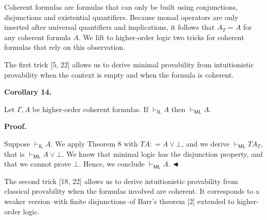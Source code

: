 \documentclass[10pt,a4paper]{article}
\begin{document}
Coherent formulas are formulas that can only be built using conjunctions, disjunctions and existential quantifiers. Because monad operators are only inserted after universal quantifiers and implications, it follows that $A_{T}=A$ for any coherent formula $A$. We lift to higher-order logic two tricks for coherent formulas that rely on this observation.\par
 
 
 
The first trick [5, 22] allows us to derive minimal provability from intuitionistic provability when the context is empty and when the formula is coherent.\par
 
 
 
\par\medskip\noindent\textbf{Corollary 14.}\par
 
 
Let $\Gamma,A$ be higher-order coherent formulas. If $\vdash_{\mathsf{IL}}A$ then $\vdash_{\mathsf{ML}}A$.\par
 
 
 
 
\par\medskip\noindent\textbf{Proof.}\par
 
 
Suppose $\vdash_{\mathsf{IL}}A$. We apply Theorem 8 with $TA\mathrel{\mathop{:}}=A\mathbin{\vee}\bot$, and we derive $\vdash_{\mathsf{ML}}TA_{T}$, that is $\vdash_{\mathsf{ML}}A\mathbin{\vee}\bot$. We know that minimal logic has the disjunction property, and that we cannot prove $\bot$. Hence, we conclude $\vdash_{\mathsf{ML}}A$. $\hfill\blacktriangleleft$\par
 
 
 
The second trick [18, 22] allows us to derive intuitionistic provability from classical provability when the formulas involved are coherent. It corresponds to a weaker version–with finite disjunctions–of Barr’s theorem [2] extended to higher-order logic.\par
 
\end{document}
